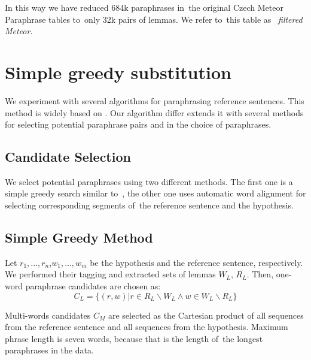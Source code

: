 \documentclass[11pt]{article}
\begin{document}
In this way we have reduced 684k paraphrases in~the original Czech Meteor 
Paraphrase tables to~only 32k pairs of lemmas. We refer to~this table as
~\textit{filtered Meteor}.

\section{Simple greedy substitution}
\label{lrec}
We experiment with several algorithms for paraphrasing reference sentences. 
This method is widely based on \cite{kauchak}. Our algorithm differ extends it 
with several methods for selecting potential paraphrase pairs and in the choice 
of paraphrases.

\subsection{Candidate Selection}
We select potential paraphrases using two different methods. The first one is a 
simple greedy search similar to~, the other one uses automatic 
word alignment for selecting corresponding segments of~the reference sentence 
and the hypothesis.

\subsection*{Simple Greedy Method}
Let $ r_1,..., r_n $,$ w_1,...,w_m $ be the hypothesis and the reference 
sentence, respectively. We performed their tagging and extracted sets of lemmas 
$ W_{L} $, $ R_{L} $. Then, one-word paraphrase candidates are chosen as:
$$ C_{L} = \lbrace (r,w) | r \in R_{L} \smallsetminus W_{L} \wedge w \in W_{L}
\smallsetminus R_{L}  \rbrace $$

Multi-words candidates $ C_M $ are selected as the Cartesian product of all 
sequences from the reference sentence and all sequences from the hypothesis. 
Maximum phrase length is seven words, because that is the length of~the longest
paraphrases in the data. %
%
\end{document}
